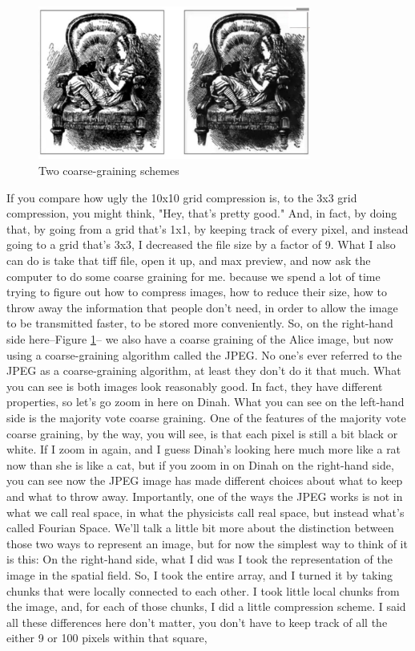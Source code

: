 \documentclass[]{article}
\begin{document}
\begin{figure}[h]
	\begin{center}
		\caption{Two coarse-graining schemes}\label{fig:alice:2:schemes}
		\includegraphics[width=0.8\textwidth]{Alice6}
	\end{center}
\end{figure}
If you compare how ugly
the 10x10 grid compression is,
to the 3x3 grid compression,
you might think,
"Hey, that's pretty good."
And, in fact, by doing that,
by going from a grid that's 1x1,
by keeping track of every pixel,
and instead going to a grid that's 3x3,
I decreased the file size
by a factor of 9.
What I also can do is take that tiff file,
open it up, and max preview,
and now ask the computer
to do some coarse graining for me.
because we spend a lot of time trying
to figure out how to compress images,
how to reduce their size,
how to throw away the information
that people don't need,
in order to allow the image
to be transmitted faster,
to be stored more conveniently.
So, on the right-hand side here--Figure \ref{fig:alice:2:schemes}--
we also have a coarse graining of the Alice image, but now using a coarse-graining algorithm called the JPEG.
No one's ever referred to the JPEG as a coarse-graining algorithm, at least they don't do it that much.
What you can see is both images look reasonably good.
In fact, they have different properties,
so let's go zoom in here on Dinah.
What you can see on the left-hand side
is the majority vote coarse graining.
One of the features of the majority vote
coarse graining, by the way, you will see,
is that each pixel
is still a bit black or white.
If I zoom in again,
and I guess Dinah's looking here much more
like a rat now than she is like a cat,
but if you zoom in on Dinah
on the right-hand side,
you can see now the JPEG image
has made different choices
about what to keep and what to throw away.
Importantly, one of the ways
the JPEG works
is not in what we call real space,
in what the physicists call real space,
but instead what's called Fourian Space.
We'll talk a little bit more
about the distinction between
those two ways to represent an image,
but for now the simplest way
to think of it is this:
On the right-hand side,
what I did was I took the representation
of the image in the spatial field.
So, I took the entire array,
and I turned it by taking chunks
that were locally connected to each other.
I took little local chunks from the image,
and, for each of those chunks,
I did a little compression scheme.
I said all these differences here
don't matter,
you don't have to keep track
of all the either 9 or 100 pixels
within that square,
\end{document}
